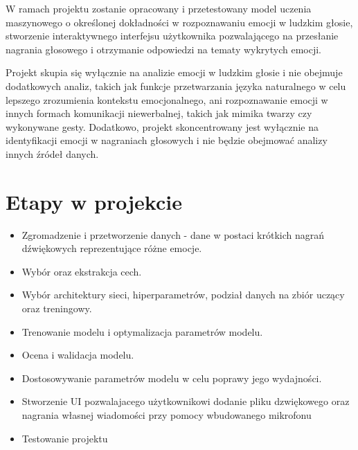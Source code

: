 \documentclass[12pt,titlepage]{article}
\begin{document}
W ramach projektu zostanie opracowany i przetestowany model uczenia maszynowego o określonej dokładności w rozpoznawaniu emocji w ludzkim głosie, stworzenie interaktywnego interfejsu użytkownika pozwalającego na przesłanie nagrania głosowego i otrzymanie odpowiedzi na tematy wykrytych emocji.

Projekt skupia się wyłącznie na analizie emocji w ludzkim głosie i nie obejmuje dodatkowych analiz, takich jak funkcje przetwarzania języka naturalnego w celu lepszego zrozumienia kontekstu emocjonalnego, ani rozpoznawanie emocji w innych formach komunikacji niewerbalnej, takich jak mimika twarzy czy wykonywane gesty. Dodatkowo, projekt skoncentrowany jest wyłącznie na identyfikacji emocji w nagraniach głosowych i nie będzie obejmować analizy innych źródeł danych.



\section{Etapy w projekcie}
\begin{itemize}
    \item Zgromadzenie i przetworzenie danych - dane w postaci krótkich nagrań dźwiękowych reprezentujące różne emocje.
    \item Wybór oraz ekstrakcja cech.
    \item Wybór architektury sieci, hiperparametrów, podział danych na zbiór uczący oraz treningowy.
    \item Trenowanie modelu i optymalizacja parametrów modelu.
    \item Ocena i walidacja modelu.
    \item Dostosowywanie parametrów modelu w celu poprawy jego wydajności.
    \item Stworzenie UI pozwalajacego użytkownikowi dodanie pliku dzwiękowego oraz nagrania własnej wiadomości przy pomocy wbudowanego mikrofonu
    \item Testowanie projektu
\end{itemize}
\end{document}
